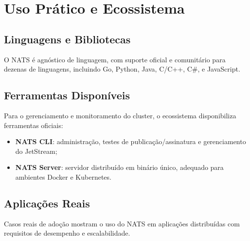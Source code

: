 \section{Uso Prático e Ecossistema}

\subsection{Linguagens e Bibliotecas}
O NATS é agnóstico de linguagem, com suporte oficial e comunitário para dezenas de linguagens, incluindo Go, Python, Java, C/C++, C\#, e JavaScript.

\subsection{Ferramentas Disponíveis}

Para o gerenciamento e monitoramento do cluster, o ecossistema disponibiliza ferramentas oficiais:

\begin{itemize}
\item \textbf{NATS CLI}: administração, testes de publicação/assinatura e gerenciamento do JetStream;

\item \textbf{NATS Server}: servidor distribuído em binário único, adequado para ambientes Docker e Kubernetes.
\end{itemize}

\subsection{Aplicações Reais}
Casos reais de adoção mostram o uso do NATS em aplicações distribuídas com requisitos de desempenho e escalabilidade.

